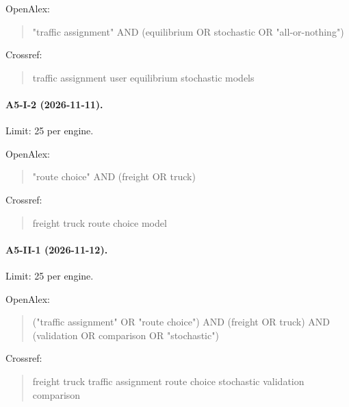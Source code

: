 \noindent OpenAlex:

\begin{quote}\footnotesize\ttfamily\raggedright

"traffic assignment" AND (equilibrium OR stochastic OR "all-or-nothing")

\end{quote}

\noindent Crossref:

\begin{quote}\footnotesize\ttfamily\raggedright

traffic assignment user equilibrium stochastic models

\end{quote}

\paragraph{A5-I-2 (2026-11-11).} Limit: 25 per engine.

\noindent OpenAlex:

\begin{quote}\footnotesize\ttfamily\raggedright

"route choice" AND (freight OR truck)

\end{quote}

\noindent Crossref:

\begin{quote}\footnotesize\ttfamily\raggedright

freight truck route choice model

\end{quote}

\paragraph{A5-II-1 (2026-11-12).} Limit: 25 per engine.

\noindent OpenAlex:

\begin{quote}\footnotesize\ttfamily\raggedright

("traffic assignment" OR "route choice") AND (freight OR truck) AND (validation OR comparison OR "stochastic")

\end{quote}

\noindent Crossref:

\begin{quote}\footnotesize\ttfamily\raggedright

freight truck traffic assignment route choice stochastic validation comparison

\end{quote}

